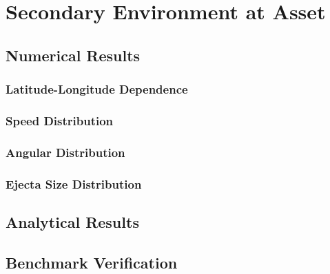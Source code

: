 \documentclass{article}
\begin{document}
\section{Secondary Environment at Asset}\label{sec:Secondary Environment}

\subsection{Numerical Results}\label{ssec:Numerical Results}

\subsubsection{Latitude-Longitude Dependence}\label{sssec:env:Latitude-Longitude Dependence}

\subsubsection{Speed Distribution}\label{sssec:env:Speed Distribution}

\subsubsection{Angular Distribution}\label{sssec:env:Angular Distribution}

\subsubsection{Ejecta Size Distribution}\label{sssec:env:Ejecta Size Distribution}


\subsection{Analytical Results}\label{ssec:Analytical Results}


\subsection{Benchmark Verification}\label{ssec:Benchmark Verification}
\end{document}
